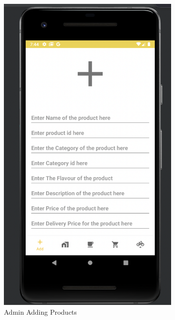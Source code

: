 \begin{figure}[H]
\begin{subfigure}[b]{0.3\textwidth}
         \includegraphics[width=\textwidth]{m5}
         \caption{Admin Adding Products}
         \label{third disp}
     \end{subfigure}
     \hfill
     \begin{subfigure}[b]{0.3\textwidth}
         \centering

\end{subfigure}
\end{figure}
